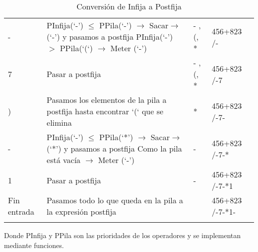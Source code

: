 \documentclass[12pt ]{article}
\begin{document}
\begin{longtable}[h]{p{2cm} p{5cm} p{2.5cm} p{2.5 cm}}
 	
 -	&PInfija(‘-’) $\leq$ PPila(‘-’)
 	$\rightarrow$ Sacar$\rightarrow$(‘-’) y pasamos a postfija
 	PInfija(‘-’) $>$ PPila(‘(‘) $\rightarrow$ Meter (‘-’) 	&- , (, * 	&456+823\hspace{0.2 cm}$\hat{{}}$\hspace{0.2 cm} /-	\\
 	\rowcolor{gray!20} 7& Pasar a postfija 	&- , (, * 	& 456+823\hspace{0.1 cm}$\hat{{}}$\hspace{0.1 cm} /-7\\
 	
 	
 )	& Pasamos los elementos de la pila a postfija hasta encontrar ‘(‘ que se elimina	&*	&  456+823\hspace{0.1 cm}$\hat{{}}$\hspace{0.1 cm} /-7-	\\
 	\rowcolor{gray!20}- & PInfija(‘-’) $\leq$ PPila(‘*’)
 	$\rightarrow$ Sacar$\rightarrow$(‘*’) y pasamos a postfija
 	Como la pila está vacía $\rightarrow$ Meter (‘-’) 	&-	&456+823\hspace{0.1 cm}$\hat{{}}$\hspace{0.1 cm} /-7-*\\
 	
 	
 	1&	Pasar a postfija&-	&456+823\hspace{0.1 cm}$\hat{{}}$\hspace{0.1 cm} /-7-*1	\\
 	\rowcolor{gray!20} Fin entrada &  Pasamos todo lo que queda en la pila a la expresión postfija	&	& 456+823\hspace{0.1 cm}$\hat{{}}$\hspace{0.1 cm} /-7-*1-\\
 	
 	
 	
 	
 	\caption{Conversión de Infija a Postfija}
 \end{longtable}
 
 Donde PInfija y PPila son las prioridades de los operadores y se implementan mediante funciones.
 
\end{document}
